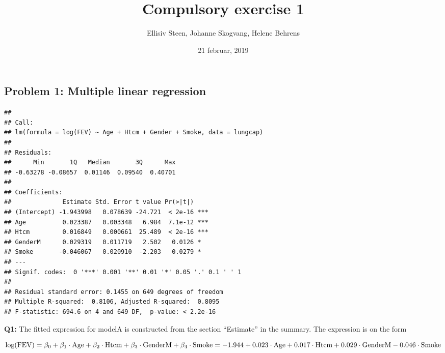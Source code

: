 \documentclass[]{article}
\title{Compulsory exercise 1}
\author{Ellisiv Steen, Johanne Skogvang, Helene Behrens}
\date{21 februar, 2019}
\newenvironment{Shaded}{\begin{snugshade}}{\end{snugshade}}
\newcommand{\KeywordTok}[1]{\textcolor[rgb]{0.13,0.29,0.53}{\textbf{#1}}}
\newcommand{\DataTypeTok}[1]{\textcolor[rgb]{0.13,0.29,0.53}{#1}}
\newcommand{\FloatTok}[1]{\textcolor[rgb]{0.00,0.00,0.81}{#1}}
\newcommand{\StringTok}[1]{\textcolor[rgb]{0.31,0.60,0.02}{#1}}
\newcommand{\OperatorTok}[1]{\textcolor[rgb]{0.81,0.36,0.00}{\textbf{#1}}}
\newcommand{\NormalTok}[1]{#1}
\begin{document}
\maketitle

\subsection{Problem 1: Multiple linear
regression}\label{problem-1-multiple-linear-regression}

\begin{Shaded}
\end{Shaded}

\begin{verbatim}
## 
## Call:
## lm(formula = log(FEV) ~ Age + Htcm + Gender + Smoke, data = lungcap)
## 
## Residuals:
##      Min       1Q   Median       3Q      Max 
## -0.63278 -0.08657  0.01146  0.09540  0.40701 
## 
## Coefficients:
##              Estimate Std. Error t value Pr(>|t|)    
## (Intercept) -1.943998   0.078639 -24.721  < 2e-16 ***
## Age          0.023387   0.003348   6.984  7.1e-12 ***
## Htcm         0.016849   0.000661  25.489  < 2e-16 ***
## GenderM      0.029319   0.011719   2.502   0.0126 *  
## Smoke       -0.046067   0.020910  -2.203   0.0279 *  
## ---
## Signif. codes:  0 '***' 0.001 '**' 0.01 '*' 0.05 '.' 0.1 ' ' 1
## 
## Residual standard error: 0.1455 on 649 degrees of freedom
## Multiple R-squared:  0.8106, Adjusted R-squared:  0.8095 
## F-statistic: 694.6 on 4 and 649 DF,  p-value: < 2.2e-16
\end{verbatim}

\textbf{Q1:} The fitted expression for modelA is constructed from the
section ``Estimate'' in the summary. The expression is on the form

\[\textrm{log(FEV)} = \beta_0 + \beta_1 \cdot \textrm{Age} + \beta_2 \cdot \textrm{Htcm} + \beta_3 \cdot \textrm{GenderM} + \beta_4 \cdot \textrm{Smoke} \\
= -1.944 + 0.023\cdot \textrm{Age} + 0.017 \cdot \textrm{Htcm} + 0.029 \cdot \textrm{GenderM} - 0.046 \cdot \textrm{Smoke}\]
\end{document}
